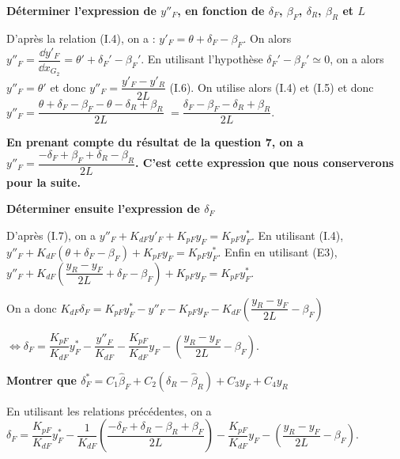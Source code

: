 \documentclass[11pt]{article}
\begin{document}
\begin{UPSTIcorrige}
\textbf{Déterminer l’expression de $y''_F$, en fonction de $\delta_F$, $\beta_F$, $\delta_R$, $\beta_R$ et $L$}


D'après la relation (I.4), on a : $y'_F = \theta + \delta_F-\beta_F$. On  alors $y''_F =\dfrac{\dd y'_F}{\dd x_{G_2}} = \theta' + \delta_F'-\beta_F'$.
 En utilisant l'hypothèse $\delta_F'-\beta_F' \simeq 0$, on a alors  $y''_F =\theta'$ et donc $y''_F =  \dfrac{y'_F-y'_R}{2L}$ (I.6). On utilise alors (I.4) et (I.5) et donc $y''_F =  \dfrac{\theta +\delta_F - \beta_F  - \theta -\delta_R + \beta_R }{2L}$ $=\dfrac{\delta_F - \beta_F   -\delta_R + \beta_R }{2L}$.

\textbf{En prenant compte du résultat de la question 7, on  a $y''_F =\dfrac{-\delta_F + \beta_F   +\delta_R - \beta_R }{2L}$. C'est cette expression que nous conserverons pour la suite.}


%

\textbf{Déterminer ensuite l’expression de $\delta_F$}

D'après (I.7), on a $y''_F  + K_{dF}y'_F+K_{pF}y_F = K_{pF}y_F^*$. En utilisant (I.4),  
$y''_F  + K_{dF}\left(  \theta + \delta_F-\beta_F \right)+K_{pF}y_F = K_{pF}y_F^*$.
Enfin en utilisant (E3), 
$y''_F  + K_{dF}\left(  \dfrac{y_R-y_F}{2L} + \delta_F-\beta_F \right)+K_{pF}y_F = K_{pF}y_F^*$.

On a donc 
$K_{dF} \delta_F  = K_{pF}y_F^* - y''_F - K_{pF}y_F- K_{dF}\left(  \dfrac{y_R-y_F}{2L} -\beta_F \right)$

$\Leftrightarrow  \delta_F  = \dfrac{K_{pF}}{K_{dF}}y_F^* - \dfrac{y''_F}{K_{dF}} - \dfrac{K_{pF}}{K_{dF}}y_F- \left(  \dfrac{y_R-y_F}{2L} -\beta_F \right)$.

\textbf{Montrer que $\delta^*_F =C_1 \hat{\beta}_F +C_2\left(\delta_R - \hat{\beta}_R\right)+C_3 y_F + C_4 y_R$}

En utilisant les relations précédentes, on a 
$\delta_F  = \dfrac{K_{pF}}{K_{dF}}y_F^* - \dfrac{1}{K_{dF}}\left(  \dfrac{ -\delta_F+ \delta_R -\beta_R+\beta_F}{2L} \right) - \dfrac{K_{pF}}{K_{dF}}y_F- \left(  \dfrac{y_R-y_F}{2L} -\beta_F \right)$.



\end{UPSTIcorrige}
\end{document}

